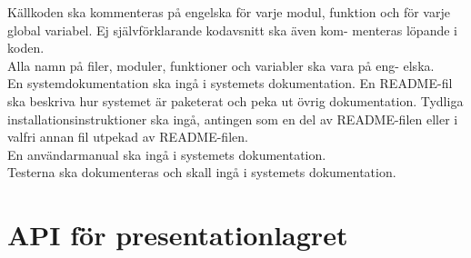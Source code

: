 \documentclass{liu_mall}
\begin{document}
            Källkoden ska kommenteras på engelska för varje modul, funktion och för varje global variabel. Ej självförklarande kodavsnitt ska även kom- menteras löpande i koden.\\
            Alla namn på filer, moduler, funktioner och variabler ska vara på eng- elska.\\
            En systemdokumentation ska ingå i systemets dokumentation. En README-fil ska beskriva hur systemet är paketerat och peka ut övrig dokumentation. Tydliga installationsinstruktioner ska ingå, antingen som en del av README-filen eller i valfri annan fil utpekad av README-filen.\\
            En användarmanual ska ingå i systemets dokumentation.\\
            Testerna ska dokumenteras och skall ingå i systemets dokumentation.\\
        \fi
        
    \section{API för presentationlagret}
\end{document}
